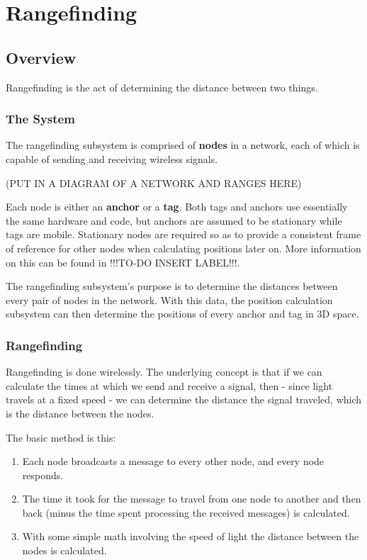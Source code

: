 
\chapter{Rangefinding} %

\label{Rangefinding}


\section{Overview}
 Rangefinding is the act of determining the distance between two things.
 
\subsection{The System}
The rangefinding subsystem is comprised of \textbf{nodes} in a network, each of which is capable of sending and receiving wireless signals.

(PUT IN A DIAGRAM OF A NETWORK AND RANGES HERE)

Each node is either an \textbf{anchor} or a \textbf{tag}. Both tags and anchors use essentially the same hardware and code, but anchors are assumed to be stationary while tags are mobile. Stationary nodes are required so as to provide a consistent frame of reference for other nodes when calculating positions later on. More information on this can be found in !!!TO-DO INSERT LABEL!!!.

The rangefinding subsystem's purpose is to determine the distances between every pair of nodes in the network. With this data, the position calculation subsystem can then determine the positions of every anchor and tag in 3D space.

\subsection{Rangefinding}
Rangefinding is done wirelessly. The underlying concept is that if we can calculate the times at which we send and receive a signal, then - since light travels at a fixed speed - we can determine the distance the signal traveled, which is the distance between the nodes. 

The basic method is this: 
\begin{enumerate}
	\item Each node broadcasts a message to every other node, and every node responds. 
	\item The time it took for the message to travel from one node to another and then back (minus the time spent processing the received messages) is calculated.
	\item With some simple math involving the speed of light the distance between the nodes is calculated. 
\end{enumerate}

